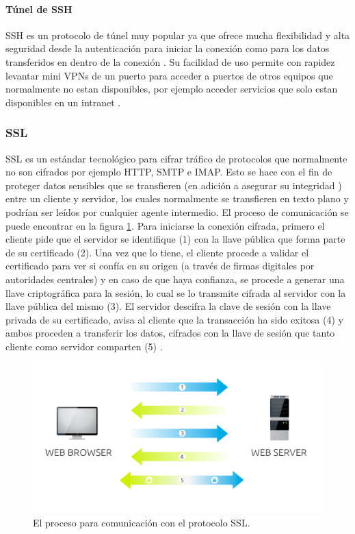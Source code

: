 \paragraph{Túnel de SSH}
SSH es un protocolo de túnel muy popular \citep{Kaspersky-Tunneling} ya que ofrece mucha flexibilidad \citep{OpenSSH} y alta seguridad desde la autenticación para iniciar la conexión como para los datos transferidos en dentro de la conexión \citep{OpenBSD-OpenSSH-Features}. Su facilidad de uso permite con rapidez levantar mini VPNs de un puerto para acceder a puertos de otros equipos que normalmente no estan disponibles, por ejemplo acceder servicios que solo estan disponibles en un intranet \citep{ENP-Tunneling}.

\subsubsection{SSL}
SSL es un estándar tecnológico para cifrar tráfico \citep{info.SSL.com-SSL} \citep{GlobalSign-SSL} de protocolos que normalmente no son cifrados por ejemplo HTTP, SMTP e IMAP. Esto se hace con el fin de proteger datos sensibles que se transfieren (en adición a asegurar su integridad \citep{info.SSL.com-SSL}) entre un cliente y servidor, los cuales normalmente se transfieren en texto plano y podrían ser leídos por cualquier agente intermedio. El proceso de comunicación se puede encontrar en la figura \ref{SSL-Proceso}. Para iniciarse la conexión cifrada, primero el cliente pide que el servidor se identifique (1) con la llave pública que forma parte de su certificado (2). Una vez que lo tiene, el cliente procede a validar el certificado para ver si confía en su origen (a través de firmas digitales por autoridades centrales) y en caso de que haya confianza, se procede a generar una llave criptográfica para la sesión, lo cual se lo transmite cifrada al servidor con la llave pública del mismo (3). El servidor descifra la clave de sesión con la llave privada de su certificado, avisa al cliente que la transacción ha sido exitosa (4) y ambos proceden a transferir los datos, cifrados con la llave de sesión que tanto cliente como servidor comparten (5) \citep{DigiCert-SSL}.

\begin{figure}
  \begin{center}
      \includegraphics[width=\textwidth]{Figures/ssl-proceso.png}
  \end{center}
  \caption{El proceso para comunicación con el protocolo SSL. \citep{DigiCert-SSL}}
  \label{SSL-Proceso}
\end{figure}

